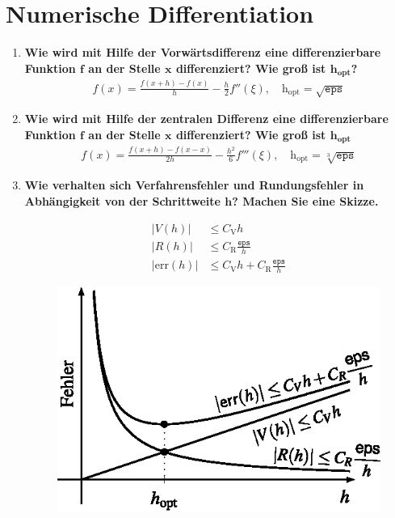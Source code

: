 \section{Numerische Differentiation}
	\begin{enumerate}
		\item \textbf{Wie wird mit Hilfe der Vorwärtsdifferenz eine differenzierbare Funktion \(\mathbf{f}\) an der Stelle \(\mathbf{x}\) differenziert? Wie groß ist \(\mathbf{\text{h}_{\text{opt}}}\)?}
			\begin{align*}
				f(x)=\frac{f(x+h)-f(x)}{h}-\frac{h}{2}f''(\xi), \quad \text{h}_{\text{opt}}=\sqrt{\texttt{eps}}
			\end{align*}
		\item \textbf{Wie wird mit Hilfe der zentralen Differenz eine differenzierbare Funktion \(\mathbf{f}\) an der Stelle \(\mathbf{x}\) differenziert? Wie groß ist \(\mathbf{\text{h}_{\text{opt}}}\)}
			\begin{align*}
				f(x)=\frac{f(x+h)-f(x-x)}{2h}-\frac{h^2}{6}f'''(\xi), \quad \text{h}_{\text{opt}}=\sqrt[3]{\texttt{eps}}
			\end{align*}
		\item \textbf{Wie verhalten sich Verfahrensfehler und Rundungsfehler in Abhängigkeit von der Schrittweite \(\mathbf{h}\)? Machen Sie eine Skizze.}
			\begin{figure}[!htbp]
				\centering				
				\begin{minipage}{.4\textwidth}
					\centering
					\begin{align*}
						|V(h)|&\leq C_\text{V} h \\
						|R(h)|&\leq C_\text{R} \frac{\texttt{eps}}{h} \\
						|\text{err}(h)|&\leq C_\text{V} h + C_\text{R} \frac{\texttt{eps}}{h}
					\end{align*}
				\end{minipage} %
				\begin{minipage}{.5\textwidth}
					\centering
					\includegraphics[width=0.8\linewidth]{Kap2_1}

\end{minipage}
\end{figure}
\end{enumerate}
